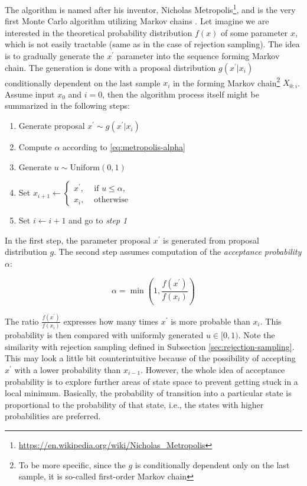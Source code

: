 \documentclass[
  digital, %
  oneside, %
  lof,     %
  lot,     %
]{fithesis4}
\begin{document}
The algorithm is named after his inventor, Nicholas Metropolis\footnote{\url{https://en.wikipedia.org/wiki/Nicholas_Metropolis}}, and is the very first Monte Carlo algorithm utilizing Markov chains \cite{metropolis1953}.
Let imagine we are interested in the theoretical probability distribution $f(x)$ of some parameter $x$, which is not easily tractable (same as in the case of rejection sampling).
The idea is to gradually generate the $x^\prime$ parameter into the sequence forming Markov chain.
The generation is done with a proposal distribution $g(x^\prime | x_{i})$ conditionally dependent on the last sample $x_{i}$ in the forming Markov chain\footnote{To be more specific, since the $g$ is conditionally dependent only on the last sample, it is so-called first-order Markov chain} $X_{0:i}$.
Assume input $x_0$ and $i = 0$, then the algorithm process itself might be summarized in the following steps:

\begin{enumerate}
  \item Generate proposal $x^\prime \sim g(x^\prime | x_{i})$
  \item Compute $\alpha$ according to \eqref{eq:metropolis-alpha}
  \item Generate $u \sim \text{Uniform}(0, 1)$
  \item Set $x_{i+1} \leftarrow \begin{cases}
    x^\prime, & \text{ if } u \leq \alpha,\\
    x_{i}, & \text{ otherwise}
    \end{cases}
    $
  \item Set $i \leftarrow i + 1$ and go to \textit{step 1}
\end{enumerate}

In the first step, the parameter proposal $x^\prime$ is generated from proposal distribution $g$.
The second step assumes computation of the \textit{acceptance probability} $\alpha$:

\begin{equation}\label{eq:metropolis-alpha}
  \alpha = \min \left(1, \frac{f(x^\prime)}{f(x_{i})}\right)
\end{equation}

The ratio $\frac{f(x^\prime)}{f(x_{i})}$ expresses how many times $x^\prime$ is more probable than $x_{i}$.
This probability is then compared with uniformly generated $u \in [0, 1)$. 
Note the similarity with rejection sampling defined in Subsection \ref{sec:rejection-sampling}.
This may look a little bit counterintuitive because of the possibility of accepting $x^\prime$ with a lower probability than $x_{i-1}$. However, the whole idea of acceptance probability is to explore further areas of state space to prevent getting stuck in a local minimum.
Basically, the probability of transition into a particular state is proportional to the probability of that state, i.e., the states with higher probabilities are preferred.
\end{document}
